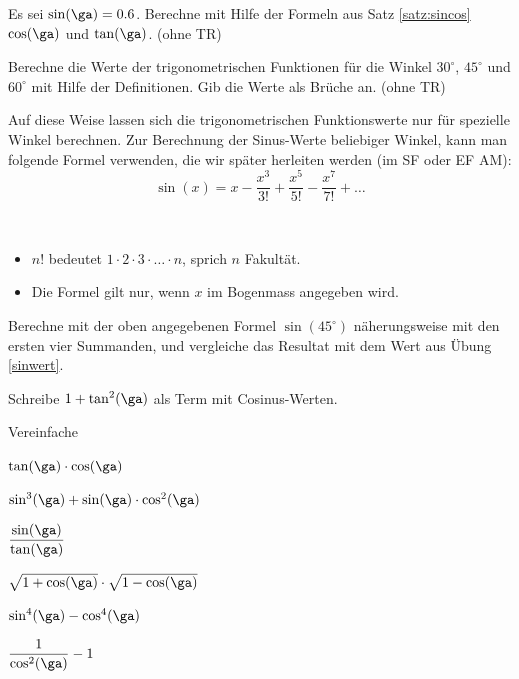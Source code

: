 \documentclass[%
11pt,%
twoside,%
titlepage,%
german,%
headsepline%
]{scrartcl}
\begin{document}
\begin{ueb}[Kopfrechnen]
  Es sei $\sin(\ga) = 0.6$. Berechne mit Hilfe der Formeln aus Satz \ref{satz:sincos} $\cos(\ga)$ und $\tan(\ga)$. (ohne TR)
\end{ueb}

\begin{ueb}[exakt]\label{sinwert}
  Berechne die Werte der trigonometrischen Funktionen für die
  Winkel $30^\circ$, $45^\circ$ und $60^\circ$ mit Hilfe der Definitionen. Gib die Werte als Brüche an. (ohne TR)
\end{ueb}

\begin{bem}
Auf diese Weise lassen sich die trigonometrischen Funktionswerte nur
für spe\-ziel\-le Winkel berechnen. Zur Berechnung der Sinus-Werte
beliebiger Winkel, kann man folgende Formel verwenden, die wir
später herleiten werden (im SF oder EF AM):
$$\sin(x) = x-\frac{x^3}{3!}+\frac{x^5}{5!}-\frac{x^7}{7!}+\dots$$
\end{bem}
\begin{bem}
\
  \begin{itemize}
    \item $n!$ bedeutet $1\cdot2\cdot3\cdot\dots\cdot n$, sprich
    \glqq $n$ Fakultät\grqq.
    \item Die Formel gilt nur, wenn $x$ im Bogenmass angegeben wird.
  \end{itemize}
\end{bem}
\begin{ueb}
  Berechne mit der oben angegebenen Formel $\sin(45^\circ)$
  nä\-he\-rungs\-wei\-se mit den ersten vier Summanden, und vergleiche
  das Resultat mit dem Wert aus Übung \ref{sinwert}.
\end{ueb}

\begin{ueb}[umschreiben]
  Schreibe $1+\tan^2(\ga)$ als Term mit Cosinus-Werten.
\end{ueb}
\begin{ueb}[vereinfachen]
  Vereinfache
  
  \begin{minipage}{0.49\textwidth}
  \begin{enumeratea}
    \item $\tan(\ga)\cdot\cos(\ga)$
    \item $\sin^3(\ga)+\sin(\ga)\cdot\cos^2(\ga)$
    \item $\dfrac{\sin(\ga)}{\tan(\ga)}$
    \end{enumeratea}
    \end{minipage}
    \begin{minipage}{0.49\textwidth}
    \begin{enumeratea}
    \setcounter{enumi}{3}
    \item $\sqrt{1+\cos(\ga)}\cdot\sqrt{1-\cos(\ga)}$
    \item $\sin^4(\ga)-\cos^4(\ga)$
    \item $\dfrac{1}{\cos^2(\ga)}-1$
  \end{enumeratea}
  \end{minipage}
\end{ueb}
\end{document}
